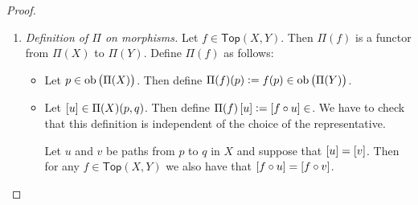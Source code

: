 \begin{proof}
\begin{enumerate}[label = \textit{Step \arabic*:},wide = 0pt, itemsep = 1.5ex]
\begin{figure}[h!tb]
\begin{subfigure}[b]{.3\textwidth}
					\caption{$u \ast \wbar{u} \simeq_{\partial I} c_p$.}
					\label{fig:reverse_path}
				\end{subfigure}
				\caption{Visualization of the proof that $\Pi(X)$ is a grupoid object.}
			\end{figure}
			Similarly, considering figure \ref{fig:associativity_axiom} leads to $F \in \mathsf{Top}(I \times I,X)$ defined by
			\begin{equation*}
				F(s,t) := \ccases{
					\displaystyle u\del[3]{\frac{4s}{t + 1}} & -1 \leq 4s - 1 \leq t,\\
					\displaystyle v(4s - t - 1) & t \leq 4s - 1 \leq t + 1,\\
					\displaystyle w\del[3]{\frac{4s - t - 2}{4 - t - 2}} & t + 1 \leq 4s - 1 \leq 3.
				}
			\end{equation*}
			Lastly, we check that $\Pi(X)$ is a grupoid. To this end, for a path $u$ from $p$ to $q$, define its  by
			\begin{equation*}
				\wbar{u}(s) := u(1 - s). 
			\end{equation*}
			We claim that $u \ast \wbar{u} \simeq_{\partial I} c_p$. From figure \ref{fig:reverse_path} we deduce that $F \in \mathsf{Top}(I \times I,X)$ is given by
			\begin{equation*}
				F(s,t) := \ccases{
					u(2s) & 0 \leq 2s \leq 1 - t,\\
					u(1 - t) & 1 - t \leq 2s \leq t + 1,\\
					\wbar{u}(2s - 1) & t + 1 \leq 2s \leq 2.
				}
			\end{equation*}
		\item \textit{Definition of $\Pi$ on morphisms.} Let $f \in \mathsf{Top}(X,Y)$. Then $\Pi(f)$ is a functor from $\Pi(X)$ to $\Pi(Y)$. Define $\Pi(f)$ as follows:
			\begin{itemize}[leftmargin = *]
				\item Let $p \in \ob\del[1]{\Pi(X)}$. Then define $\Pi(f)(p) := f(p) \in \ob\del[1]{\Pi(Y)}$.
				\item Let $\sbr{u} \in \Pi(X)(p,q)$. Then define $\Pi(f)\sbr{u} := \sbr[0]{f \circ u} \in $. We have to check that this definition is independent of the choice of the representative.

					\begin{lemma}
						Let $u$ and $v$ be paths from $p$ to $q$ in $X$ and suppose that $\sbr{u} = \sbr{v}$. Then for any $f \in \mathsf{Top}(X,Y)$ we also have that $\sbr[0]{f \circ u} = \sbr[0]{f \circ v}$.
					\end{lemma}


\end{itemize}
\end{enumerate}
\end{proof}

